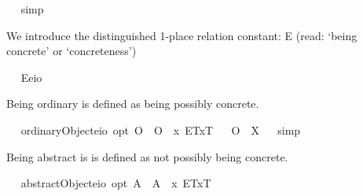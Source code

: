 \begin{isabellebody}
\isadelimproof
\ %
\endisadelimproof
%
\isatagproof
{}\isamarkupfalse%
\ simp%
\endisatagproof
{\isafoldproof}%
%
\isadelimproof
%
\endisadelimproof
\ \isamarkupfalse%
%
\isadelimproof
\ %
\endisadelimproof
%
\isatagproof
{}\isamarkupfalse%
\ %
%
\endisatagproof
{\isafoldproof}%
%
\isadelimproof
%
\endisadelimproof
%
\isamarkuptrue%
%
\begin{isamarkuptext}%
We introduce the distinguished 1-place relation constant: E (read: ‘being concrete’ or ‘concreteness’)%
\end{isamarkuptext}%
\isamarkuptrue%
\ \isamarkupfalse%
\ E{\isacharcolon}{\isacharcolon}{\isachardoublequoteopen}{\isacharparenleft}e{\isasymRightarrow}io{\isacharparenright}{\isachardoublequoteclose}%
\begin{isamarkuptext}%
Being ordinary is defined as being possibly concrete.%
\end{isamarkuptext}%
\isamarkuptrue%
\ \isamarkupfalse%
\ ordinaryObject{\isacharcolon}{\isacharcolon}{\isachardoublequoteopen}{\isacharparenleft}e{\isasymRightarrow}io{\isacharparenright}\ opt{\isachardoublequoteclose}\ {\isacharparenleft}{\isachardoublequoteopen}O{\isacharbang}{\isachardoublequoteclose}{\isacharparenright}\ \ {\isachardoublequoteopen}O{\isacharbang}\ {\isasymequiv}\ \isactrlbold {\isasymlambda}x{\isachardot}\ \isactrlbold {\isasymdiamond}{\isasymlparr}E\isactrlsup T{\isacharcomma}x\isactrlsup T{\isasymrparr}{\isachardoublequoteclose}\isanewline
\isanewline
\ \isamarkupfalse%
\ {\isachardoublequoteopen}O{\isacharbang}\ {\isacharequal}\ X{\isachardoublequoteclose}%
\isadelimproof
\ %
\endisadelimproof
%
\isatagproof
{}\isamarkupfalse%
\ simp\ \isamarkupfalse%
\ \ \ \ \ \ \ %
%
\endisatagproof
{\isafoldproof}%
%
\isadelimproof
%
\endisadelimproof
%
\begin{isamarkuptext}%
Being abstract is is defined as not possibly being concrete.%
\end{isamarkuptext}%
\isamarkuptrue%
\ \isamarkupfalse%
\ abstractObject{\isacharcolon}{\isacharcolon}{\isachardoublequoteopen}{\isacharparenleft}e{\isasymRightarrow}io{\isacharparenright}\ opt{\isachardoublequoteclose}\ {\isacharparenleft}{\isachardoublequoteopen}A{\isacharbang}{\isachardoublequoteclose}{\isacharparenright}\ \ {\isachardoublequoteopen}A{\isacharbang}\ {\isasymequiv}\ \isactrlbold {\isasymlambda}x{\isachardot}\ \isactrlbold {\isasymnot}{\isacharparenleft}\isactrlbold {\isasymdiamond}{\isasymlparr}E\isactrlsup T{\isacharcomma}x\isactrlsup T{\isasymrparr}{\isacharparenright}{\isachardoublequoteclose}\isanewline

\end{isabellebody}
